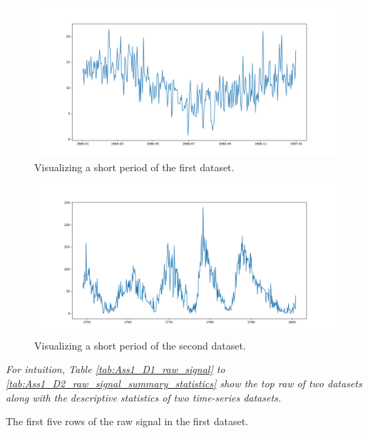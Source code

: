\begin{figure}[H]
    \centering
    \begin{minipage}[b]{1\textwidth}
        \includegraphics[width=\textwidth]{figures/Ass1/Ass1_D1_raw_signal_1986.png}
    \end{minipage}
    \caption{Visualizing a short period of the first dataset.}
    \label{fig:Ass1_D1_raw_signal_1986}
\end{figure}


\begin{figure}[H]
    \centering
    \begin{minipage}[b]{1\textwidth}
        \includegraphics[width=\textwidth]{figures/Ass1/Ass1_D2_raw_signal_1990.png}
    \end{minipage}
    \caption{Visualizing a short period of the second dataset.}
    \label{fig:Ass1_D2_raw_signal_1990}
\end{figure}

\textit{For intuition, Table \ref{tab:Ass1_D1_raw_signal} to  \ref{tab:Ass1_D2_raw_signal_summary_statistics} show the top raw of two datasets along with the descriptive statistics of two time-series datasets.}


\begin{table}[H]
 \centering
\caption{The first five rows of the raw signal in the first dataset.}
\label{tab:Ass1_D1_raw_signal}

\end{table}

